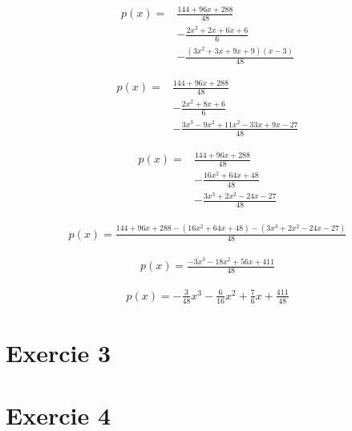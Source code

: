 \documentclass[12pt, letterpaper]{article}
\begin{document}
\begin{equation*}
\begin{split}
  p(x) = & \frac{144 + 96x + 288}{48} \\
         & -\frac{2x^2 + 2x + 6x + 6}{6} \\
         & -\frac{(3x^2 + 3x + 9x + 9)(x - 3)}{48}
\end{split}
\end{equation*}

\begin{equation*}
\begin{split}
  p(x) = & \frac{144 + 96x + 288}{48} \\
         & -\frac{2x^2 + 8x + 6}{6} \\
         & -\frac{3x^3 - 9x^2 + 11x^2 - 33x + 9x - 27}{48}
\end{split}
\end{equation*}

\begin{equation*}
\begin{split}
  p(x) = & \frac{144 + 96x + 288}{48} \\
         & -\frac{16x^2 + 64x + 48}{48} \\
         & -\frac{3x^3 + 2x^2 - 24x - 27}{48}
\end{split}
\end{equation*}

\begin{equation*}
\begin{split}
  p(x) = \frac{144 + 96x + 288 - (16x^2 + 64x + 48) - (3x^3 + 2x^2 - 24x - 27)}{48}
\end{split}
\end{equation*}

\begin{equation*}
\begin{split}
  p(x) = \frac{-3x^3 - 18x^2 + 56x + 411}{48}
\end{split}
\end{equation*}

\begin{equation*}
\begin{split}
  p(x) = -\frac{3}{48}x^3 - \frac{6}{16}x^2 + \frac{7}{6}x + \frac{411}{48}
\end{split}
\end{equation*}

\section{Exercie 3}
\section{Exercie 4}
\end{document}
